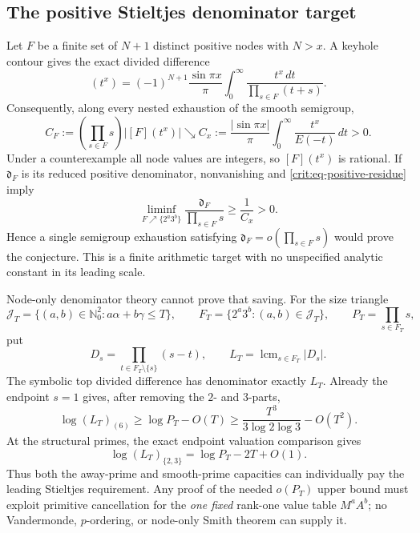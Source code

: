 \documentclass[11pt,oneside]{article}
\theoremstyle{definition}
\theoremstyle{remark}
\newcommand{\Nzero}{\mathbb N_0}
\begin{document}
\subsection{The positive Stieltjes denominator target}
\label{crit:denominator-target}

Let $F$ be a finite set of $N+1$ distinct positive nodes with $N>x$.  A keyhole contour gives
the exact divided difference
\begin{equation}
 [F](t^x)=(-1)^{N+1}\frac{\sin\pi x}{\pi}
 \int_0^\infty\frac{t^x\,dt}{\prod_{s\in F}(t+s)}.
 \label{crit:eq-stieltjes-divdiff}
\end{equation}
Consequently, along every nested exhaustion of the smooth semigroup,
\begin{equation}
 C_F:=\left(\prod_{s\in F}s\right)|[F](t^x)|
 \searrow
 C_x:=\frac{|\sin\pi x|}{\pi}\int_0^\infty\frac{t^x}{E(-t)}\,dt>0.
 \label{crit:eq-positive-residue}
\end{equation}
Under a counterexample all node values are integers, so $[F](t^x)$ is rational.  If
$\mathfrak d_F$ is its reduced positive denominator, nonvanishing and
\eqref{crit:eq-positive-residue} imply
\begin{equation}
 \boxed{
 \liminf_{F\nearrow\{2^a3^b\}}
 \frac{\mathfrak d_F}{\prod_{s\in F}s}\ge\frac1{C_x}>0.}
 \label{crit:eq-denominator-lower}
\end{equation}
Hence a single semigroup exhaustion satisfying
$\mathfrak d_F=o(\prod_{s\in F}s)$ would prove the conjecture.  This is a finite arithmetic
target with no unspecified analytic constant in its leading scale.

Node-only denominator theory cannot prove that saving.  For the size triangle
\[
 \mathcal J_T=\{(a,b)\in\Nzero^2:a\alpha+b\gamma\le T\},\qquad
 F_T=\{2^a3^b:(a,b)\in\mathcal J_T\},\qquad
 P_T=\prod_{s\in F_T}s,
\]
put
\[
 D_s=\prod_{t\in F_T\setminus\{s\}}(s-t),\qquad
 L_T=\operatorname{lcm}_{s\in F_T}|D_s|.
\]
The symbolic top divided difference has denominator exactly $L_T$.  Already the endpoint
$s=1$ gives, after removing the $2$- and $3$-parts,
\begin{equation}
 \log (L_T)_{(6)}\ge\log P_T-O(T)
 \ge\frac{T^3}{3\log2\log3}-O(T^2).
 \label{crit:eq-away-capacity}
\end{equation}
At the structural primes, the exact endpoint valuation comparison gives
\begin{equation}
 \log (L_T)_{\{2,3\}}=\log P_T-2T+O(1).
 \label{crit:eq-smooth-capacity}
\end{equation}
Thus both the away-prime and smooth-prime capacities can individually pay the leading
Stieltjes requirement.  Any proof of the needed $o(P_T)$ upper bound must exploit primitive
cancellation for the \emph{one fixed} rank-one value table $M^aA^b$; no Vandermonde,
$p$-ordering, or node-only Smith theorem can supply it.
\end{document}
